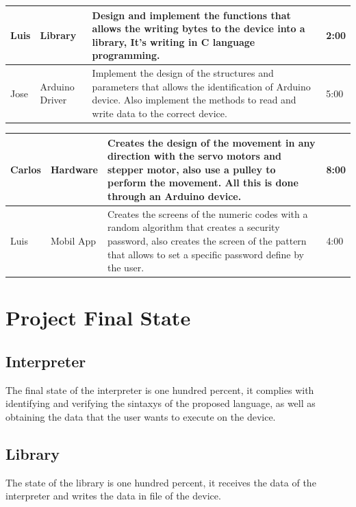 \documentclass[12pt,twoside]{article}
\begin{document}
\begin{table}[H]
\begin{tabular}{ | m{7em} | m{7em} | m{16em} | m{4em} |}
Luis                     & Library                             & Design and implement the functions that allows the writing bytes to the device into a library, It's writing in C language programming.                                                            & 2:00         \\
\hline

Jose                     & Arduino Driver                      & Implement the design of the structures and parameters that allows the identification of Arduino device. Also implement the methods to read and write data to the correct device.                    & 5:00         \\
\hline
\end{tabular}
\end{table}

\begin{table}[H]
\centering
\begin{tabular}{ | m{7em} | m{7em} | m{16em} | m{4em} |}
\hline
Carlos                   & Hardware                            & Creates the design of the movement in any direction with the servo motors and stepper motor, also use a pulley to perform the movement. All this is done through an Arduino device.                  &   8:00            \\
\hline
Luis                     & Mobil App                           & Creates the screens of the numeric codes with a random algorithm that creates a security password, also creates the screen of the pattern that allows to set a specific password define by the user. &  4:00 	\\           \hline
\end{tabular}
\end{table}


\newpage

\section{Project Final State}

\subsection*{Interpreter}

The final state of the interpreter is one hundred percent, it complies with identifying and verifying the sintaxys of the proposed language, as well as obtaining the data that the user wants to execute on the device.\\
\subsection*{Library}
The state of the library is one hundred percent, it receives the data of the interpreter and writes the data in file of the device.
\end{document}

